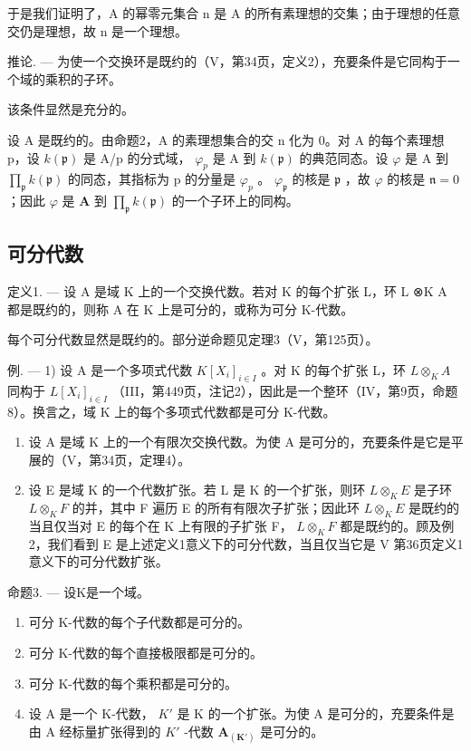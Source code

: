 于是我们证明了，A 的幂零元集合 n 是 A 的所有素理想的交集；由于理想的任意交仍是理想，故 n 是一个理想。

推论. --- 为使一个交换环是既约的（V，第34页，定义2），充要条件是它同构于一个域的乘积的子环。

该条件显然是充分的。

设 A 是既约的。由命题2，A 的素理想集合的交 n 化为 0。对 A 的每个素理想 p，设 \(k(\mathfrak{p})\) 是 A/p 的分式域， \(\varphi_{p}\) 是 A 到 \(k(\mathfrak{p})\) 的典范同态。设 \(\varphi\) 是 A 到 \(\prod_{\mathfrak{p}} k(\mathfrak{p})\) 的同态，其指标为 p 的分量是 \(\varphi_{p}\) 。 \(\varphi_{\mathfrak{p}}\) 的核是 \(\mathfrak{p}\) ，故 \(\varphi\) 的核是 \(\mathfrak{n} = 0\) ；因此 \(\varphi\) 是 \(\mathbf{A}\) 到 \(\prod_{\mathfrak{p}} k(\mathfrak{p})\) 的一个子环上的同构。

\subsection{可分代数}

定义1. --- 设 A 是域 K 上的一个交换代数。若对 K 的每个扩张 L，环 L ⊗K A 都是既约的，则称 A 在 K 上是可分的，或称为可分 K-代数。

每个可分代数显然是既约的。部分逆命题见定理3（V，第125页）。

例. --- 1) 设 A 是一个多项式代数 \(K[X_{i}]_{i \in I}\) 。对 K 的每个扩张 L，环 \(L \otimes_{K} A\) 同构于 \(L[X_{i}]_{i \in I}\) （III，第449页，注记2），因此是一个整环（IV，第9页，命题8）。换言之，域 K 上的每个多项式代数都是可分 K-代数。

\begin{enumerate}
\def\labelenumi{\arabic{enumi})}
\setcounter{enumi}{1}
\item
  设 A 是域 K 上的一个有限次交换代数。为使 A 是可分的，充要条件是它是平展的（V，第34页，定理4）。
\item
  设 E 是域 K 的一个代数扩张。若 L 是 K 的一个扩张，则环 \(L \otimes_{K} E\) 是子环 \(L \otimes_{K} F\) 的并，其中 F 遍历 E 的所有有限次子扩张；因此环 \(L \otimes_{K} E\) 是既约的当且仅当对 E 的每个在 K 上有限的子扩张 F， \(L \otimes_{K} F\) 都是既约的。顾及例2，我们看到 E 是上述定义1意义下的可分代数，当且仅当它是 V 第36页定义1意义下的可分代数扩张。
\end{enumerate}

命题3. --- 设K是一个域。

\begin{enumerate}
\def\labelenumi{\alph{enumi})}
\item
  可分 K-代数的每个子代数都是可分的。
\item
  可分 K-代数的每个直接极限都是可分的。
\item
  可分 K-代数的每个乘积都是可分的。
\item
  设 A 是一个 K-代数， \(K'\) 是 K 的一个扩张。为使 A 是可分的，充要条件是由 A 经标量扩张得到的 \(K'\) -代数 \(\mathbf{A}_{(\mathbf{K}')}\) 是可分的。
\end{enumerate}


